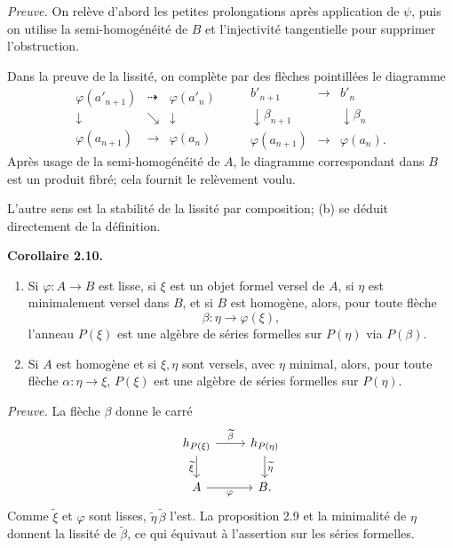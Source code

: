 \documentclass[11pt]{article}
\begin{document}
\emph{Preuve.} On rel\`eve d'abord les petites prolongations apr\`es application de \(\psi\),
puis on utilise la semi-homog\'en\'eit\'e de \(B\) et l'injectivit\'e tangentielle pour supprimer
l'obstruction.

Dans la preuve de la lissit\'e, on compl\`ete par des fl\`eches pointill\'ees le diagramme
\[
\begin{array}{ccccc}
\varphi(a'_{n+1}) & \dashrightarrow & \varphi(a'_n)\\
\downarrow & \searrow & \downarrow\\
\varphi(a_{n+1}) & \longrightarrow & \varphi(a_n)
\end{array}
\qquad
\begin{array}{ccc}
b'_{n+1} & \longrightarrow & b'_n\\
\downarrow{\scriptstyle \beta_{n+1}} && \downarrow{\scriptstyle \beta_n}\\
\varphi(a_{n+1}) & \longrightarrow & \varphi(a_n).
\end{array}
\]
Apr\`es usage de la semi-homog\'en\'eit\'e de \(A\), le diagramme correspondant dans \(B\)
est un produit fibr\'e; cela fournit le rel\`evement voulu.

L'autre sens est la stabilit\'e de la lissit\'e par composition; (b) se d\'eduit
directement de la d\'efinition.

\textbf{Corollaire 2.10.}
\begin{enumerate}[label=(\alph*)]
\item Si \(\varphi:A\to B\) est lisse, si \(\xi\) est un objet formel versel de \(A\), si
\(\eta\) est minimalement versel dans \(B\), et si \(B\) est homog\`ene, alors, pour toute fl\`eche
\[
 \beta:\eta\longrightarrow\varphi(\xi),
\]
l'anneau \(P(\xi)\) est une alg\`ebre de s\'eries formelles sur \(P(\eta)\) via \(P(\beta)\).

\item Si \(A\) est homog\`ene et si \(\xi,\eta\) sont versels, avec \(\eta\) minimal, alors,
pour toute fl\`eche \(\alpha:\eta\to\xi\), \(P(\xi)\) est une alg\`ebre de s\'eries formelles
sur \(P(\eta)\).
\end{enumerate}

\emph{Preuve.} La fl\`eche \(\beta\) donne le carr\'e
\[
\begin{tikzcd}
h_{P(\xi)} \arrow[r,"\widetilde\beta"] \arrow[d,"\widetilde\xi"'] &
h_{P(\eta)} \arrow[d,"\widetilde\eta"]\\
A \arrow[r,"\varphi"'] & B .
\end{tikzcd}
\]
Comme \(\widetilde\xi\) et \(\varphi\) sont lisses, \(\widetilde\eta\,\widetilde\beta\)
l'est. La proposition 2.9 et la minimalit\'e de \(\eta\) donnent la lissit\'e de
\(\widetilde\beta\), ce qui \'equivaut \`a l'assertion sur les s\'eries formelles.
\end{document}
